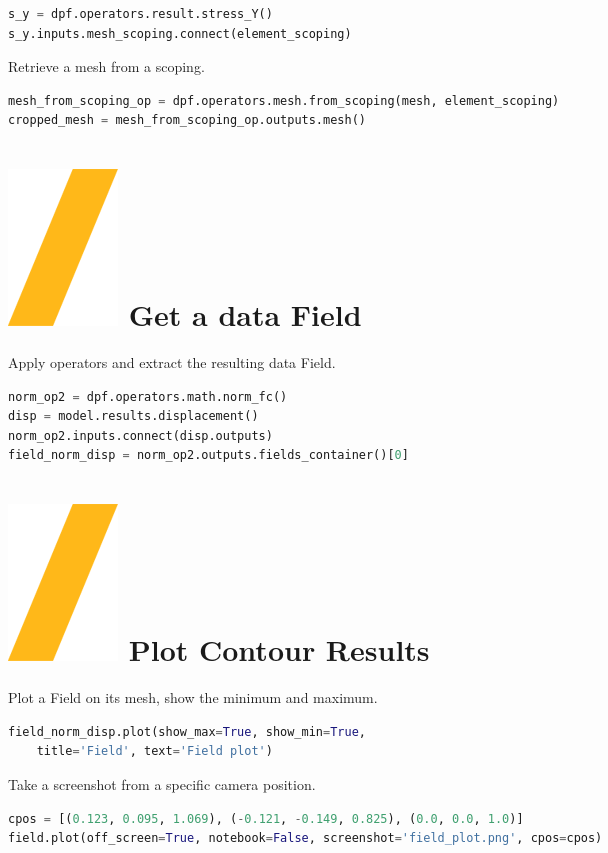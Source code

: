 \documentclass[9pt,landscape]{article}
\begin{document}
\begin{multicols}{3}
\begin{lstlisting}[language=Python]
s_y = dpf.operators.result.stress_Y()
s_y.inputs.mesh_scoping.connect(element_scoping)
\end{lstlisting}

Retrieve a mesh from a scoping.
\begin{lstlisting}[language=Python]
mesh_from_scoping_op = dpf.operators.mesh.from_scoping(mesh, element_scoping)
cropped_mesh = mesh_from_scoping_op.outputs.mesh()
\end{lstlisting}


\section{\includegraphics[height=\fontcharht\font`\S]{slash.png} Get a data Field }
Apply operators and extract the resulting data Field.
\begin{lstlisting}[language=Python]
norm_op2 = dpf.operators.math.norm_fc()
disp = model.results.displacement()
norm_op2.inputs.connect(disp.outputs)
field_norm_disp = norm_op2.outputs.fields_container()[0]
\end{lstlisting}

\vfill
\columnbreak

\section{\includegraphics[height=\fontcharht\font`\S]{slash.png} Plot Contour Results }
Plot a Field on its mesh, show the minimum and maximum.
\begin{lstlisting}[language=Python]
field_norm_disp.plot(show_max=True, show_min=True,
    title='Field', text='Field plot')
\end{lstlisting}
Take a screenshot from a specific camera position.
\begin{lstlisting}[language=Python]
cpos = [(0.123, 0.095, 1.069), (-0.121, -0.149, 0.825), (0.0, 0.0, 1.0)]
field.plot(off_screen=True, notebook=False, screenshot='field_plot.png', cpos=cpos)
\end{lstlisting}


\end{multicols}
\end{document}

